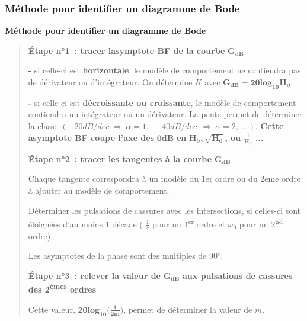 \hypertarget{mod-muxe9thode-pour-identifier-un-diagramme-de-bode}{%
\subsubsection{Méthode pour identifier un diagramme de Bode}\label{mod-muxe9thode-pour-identifier-un-diagramme-de-bode}}

\textbf{Méthode pour identifier un diagramme de Bode}

\begin{quote}
\textbf{Étape n°1~: tracer l\textquotesingle asymptote BF de la courbe} \(\mathbf{G}_{\mathbf{dB}}\)

\textbf{-} si celle-ci est \textbf{horizontale}, le modèle de comportement ne contiendra pas de dérivateur ou d'intégrateur. On détermine \(K\) avec \(\mathbf{G}_{\mathbf{dB}}\mathbf{= 20}{\mathbf{lo}\mathbf{g}_{\mathbf{10}}}\mathbf{H}_{\mathbf{0}}\).

\textbf{-} si celle-ci est \textbf{décroissante ou croissante}, le modèle de comportement contiendra un intégrateur ou un dérivateur. La pente permet de déterminer la classe \(( - 20dB/dec\  \Rightarrow \ \alpha = 1,\  - 40dB/dec\ \  \Rightarrow \ \alpha = 2,\ \ldots)\). \textbf{Cette asymptote BF coupe l'axe des} \(\mathbf{0}\mathbf{dB}\) \textbf{en} \(\mathbf{H}_{\mathbf{0}}\)\textbf{,}\(\mathbf{\ }\sqrt{\mathbf{H}_{\mathbf{0}}}\)\textbf{, ou} \(\frac{\mathbf{1}}{\mathbf{H}_{\mathbf{0}}}\) \textbf{...}

\textbf{Étape n°2~: tracer les tangentes à la courbe} \(\mathbf{G}_{\mathbf{dB}}\)

Chaque tangente correspondra à un modèle du 1er ordre ou du 2eme ordre à ajouter au modèle de comportement.

Déterminer les pulsations de cassures avec les intersections, si celles-ci sont éloignées d'au moins 1 décade ( \(\frac{1}{\tau}\) pour un 1\textsuperscript{er} ordre et \(\omega_{0}\) pour un 2\textsuperscript{nd} ordre)

Les asymptotes de la phase sont des multiples de 90°.

\textbf{Étape n°3~: relever la valeur de} \(\mathbf{G}_{\mathbf{dB}}\) \textbf{aux pulsations de cassures des 2\textsuperscript{èmes} ordres}

Cette valeur, \(\mathbf{20lo}\mathbf{g}_{\mathbf{10}}\mathbf{(}\frac{\mathbf{1}}{\mathbf{2}\mathbf{m}}\mathbf{)}\), permet de déterminer la valeur de \(m\).
\end{quote}

